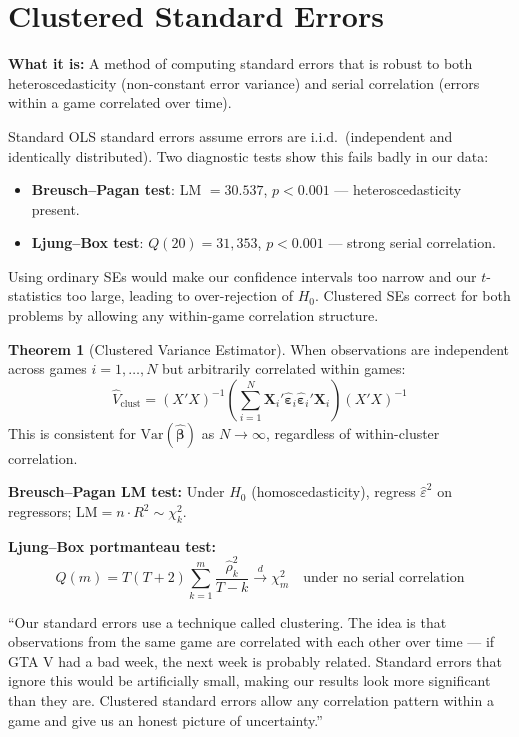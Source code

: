 \documentclass[11pt, letterpaper]{article}
\theoremstyle{definition}
\newtheorem{theorem}{Theorem}[section]
\begin{document}
\section{Clustered Standard Errors}

\textbf{What it is:} A method of computing standard errors that is robust to both heteroscedasticity (non-constant error variance) and serial correlation (errors within a game correlated over time).

\begin{whybox}
Standard OLS standard errors assume errors are i.i.d.\ (independent and identically distributed).
Two diagnostic tests show this fails badly in our data:
\begin{itemize}[nosep]
    \item \textbf{Breusch--Pagan test}: LM $= 30.537$, $p < 0.001$ --- heteroscedasticity present.
    \item \textbf{Ljung--Box test}: $Q(20) = 31{,}353$, $p < 0.001$ --- strong serial correlation.
\end{itemize}
Using ordinary SEs would make our confidence intervals too narrow and our $t$-statistics too large, leading to over-rejection of $H_0$.
Clustered SEs correct for both problems by allowing any within-game correlation structure.
\end{whybox}

\begin{mathbox}
\begin{theorem}[Clustered Variance Estimator]
When observations are independent across games $i = 1,\ldots,N$ but arbitrarily correlated within games:
\[
    \hat{V}_{\text{clust}} = (X'X)^{-1} \!\left(\sum_{i=1}^{N} \mathbf{X}_i'\hat{\boldsymbol{\varepsilon}}_i\hat{\boldsymbol{\varepsilon}}_i'\mathbf{X}_i\right)\!(X'X)^{-1}
\]
This is consistent for $\text{Var}(\hat{\boldsymbol{\beta}})$ as $N \to \infty$, regardless of within-cluster correlation.
\end{theorem}

\textbf{Breusch--Pagan LM test:} Under $H_0$ (homoscedasticity), regress $\hat{\varepsilon}^2$ on regressors; $\text{LM} = n \cdot R^2 \sim \chi^2_k$.

\textbf{Ljung--Box portmanteau test:}
\[
    Q(m) = T(T+2)\sum_{k=1}^{m} \frac{\hat{\rho}_k^2}{T-k} \xrightarrow{d} \chi^2_m \quad \text{under no serial correlation}
\]
\end{mathbox}

\begin{speakerbox}
``Our standard errors use a technique called clustering.
The idea is that observations from the same game are correlated with each other over time --- if GTA V had a bad week, the next week is probably related.
Standard errors that ignore this would be artificially small, making our results look more significant than they are.
Clustered standard errors allow any correlation pattern within a game and give us an honest picture of uncertainty.''
\end{speakerbox}
\end{document}
